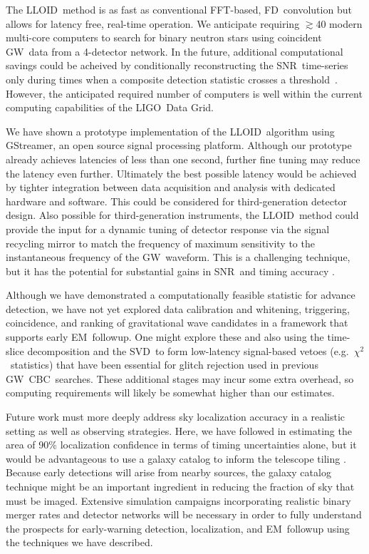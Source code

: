 \documentclass[preprint2]{aastex}
\newcommand{\GW}{GW}%
\newcommand{\EM}{EM}%
\newcommand{\CBC}{CBC}%
\newcommand{\LIGO}{LIGO}%
\newcommand{\SNR}{SNR}%
\newcommand{\SVD}{SVD}%
\newcommand{\fft}{FFT}%
\newcommand{\gstreamer}{GStreamer}
\newcommand{\lloid}{LLOID}%
\newcommand{\FD}{FD}%
\begin{document}
The \lloid\ method is as fast as conventional \fft-based, \FD\ convolution but allows for
latency free, real-time operation.  We anticipate requiring $\gtrsim$40
modern multi-core computers to search for binary neutron stars using
coincident \GW\ data from a 4-detector network.  In the future, additional
computational savings could be acheived by conditionally reconstructing the
\SNR\ time-series only during times when a composite detection statistic
crosses a threshold~\citep{svd-compdetstat}.  However, the anticipated required
number of computers is well within the current computing capabilities of the
\LIGO\ Data Grid.

We have shown a prototype implementation of the \lloid\ algorithm using
\gstreamer, an open source signal processing platform.  Although our prototype
already achieves latencies of less than one second, further fine tuning may
reduce the latency even further.  Ultimately the best
possible latency would be achieved by tighter integration between data
acquisition and analysis with dedicated hardware and software. This could be
considered for third-generation detector design.  Also possible for
third-generation instruments, the \lloid\ method could provide the input for a
dynamic tuning of detector response via the signal recycling mirror to match
the frequency of maximum sensitivity to the instantaneous frequency of the
\GW\ waveform.  This is a challenging technique, but it has the potential for
substantial gains in \SNR\ and timing accuracy \citep{PhysRevD.47.2184}.

Although we have demonstrated a computationally feasible statistic
for advance detection, we have not yet explored data calibration and whitening,
triggering, coincidence, and ranking of gravitational wave candidates in a
framework that supports early \EM\ followup.  One might explore these and also
using the time-slice decomposition and the \SVD\ to form low-latency
signal-based vetoes (e.g.~$\chi^2$~statistics) that have been essential for
glitch rejection used in previous \GW\ \CBC\ searches.  These additional stages
may incur some extra overhead, so computing requirements will likely be somewhat
higher than our estimates.

Future work must more deeply address sky localization accuracy in a
realistic setting as well as observing strategies. Here, we have followed
\citet{Fairhurst2009} in estimating the area of 90\% localization confidence in
terms of timing uncertainties alone, but it would be advantageous to use a
galaxy catalog to inform the telescope tiling \citep{galaxy-catalog}. Because
early detections will arise from nearby sources, the galaxy catalog technique
might be an important ingredient in reducing the fraction of sky that must be
imaged.  Extensive simulation campaigns incorporating realistic binary merger
rates and detector networks will be necessary in order to fully understand the
prospects for early-warning detection, localization, and \EM\ followup using
the techniques we have described.
\end{document}
